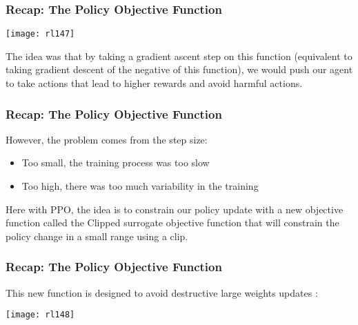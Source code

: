 \begin{frame}[fragile]\frametitle{Recap: The Policy Objective Function}

\begin{center}
\texttt{[image: rl147]}
\end{center}

The idea was that by taking a gradient ascent step on this function (equivalent to taking gradient descent of the negative of this function), we would push our agent to take actions that lead to higher rewards and avoid harmful actions.

\end{frame}

\begin{frame}[fragile]\frametitle{Recap: The Policy Objective Function}

However, the problem comes from the step size:

\begin{itemize}
\item Too small, the training process was too slow
\item Too high, there was too much variability in the training
\end{itemize}

Here with PPO, the idea is to constrain our policy update with a new objective function called the Clipped surrogate objective function that will constrain the policy change in a small range using a clip.

\end{frame}


\begin{frame}[fragile]\frametitle{Recap: The Policy Objective Function}

This new function is designed to avoid destructive large weights updates :

\begin{center}
\texttt{[image: rl148]}
\end{center}

\end{frame}

